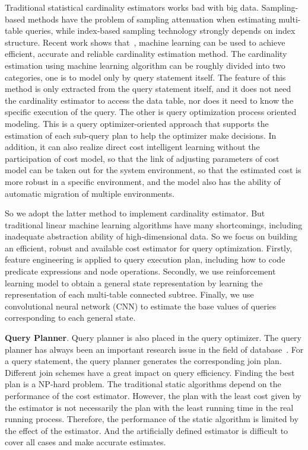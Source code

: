 Traditional statistical cardinality estimators works bad with big data. Sampling-based methods have the problem of sampling attenuation when estimating multi-table queries, while index-based sampling technology strongly depends on index structure. Recent work shows that~\cite{DBLP:conf/cidr/KipfKRLBK19, DBLP:conf/sigmod/OrtizBGK18}, machine learning can be used to achieve efficient, accurate and reliable cardinality estimation method. 
The cardinality estimation using machine learning algorithm can be roughly divided into two categories, 
one is to model only by query statement itself. The feature of this method is only extracted from the query statement itself, and it does not need the cardinality estimator to access the data table, nor does it need to know the specific execution of the query.
The other is query optimization process oriented modeling. This is a query optimizer-oriented approach that supports the estimation of each sub-query plan to help the optimizer make decisions. In addition, it can also realize direct cost intelligent learning without the participation of cost model, so that the link of adjusting parameters of cost model can be taken out for the system environment, so that the estimated cost is more robust in a specific environment, and the model also has the ability of automatic migration of multiple environments.

So we adopt the latter method to implement cardinality estimator. But traditional linear machine learning algorithms have many shortcomings, including inadequate abstraction ability of high-dimensional data. So we focus on building an efficient, robust and available cost estimator for query optimization. Firstly, feature engineering is applied to query execution plan, including how to code predicate expressions and node operations. Secondly, we use reinforcement learning model to obtain a general state representation by learning the representation of each multi-table connected subtree. Finally, we use convolutional neural network (CNN) to estimate the base values of queries corresponding to each general state.

\noindent \textbf{Query Planner}. Query planner is also placed in the query optimizer. The query planner has always been an important research issue in the field of database~\cite{DBLP:conf/sigmod/SelingerACLP79}. 
For a query statement, the query planner generates the corresponding join plan. Different join schemes have a great impact on query efficiency. Finding the best plan is a NP-hard problem. 
The traditional static algorithms depend on the performance of the cost estimator. However, the plan with the least cost given by the estimator is not necessarily the plan with the least running time in the real running process. Therefore, the performance of the static algorithm is limited by the effect of the estimator. 
And the artificially defined estimator is difficult to cover all cases and make accurate estimates.

